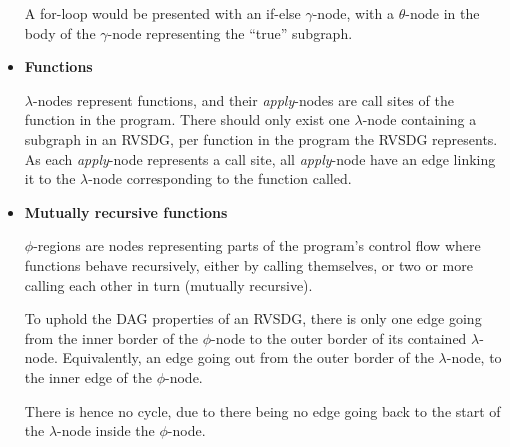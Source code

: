 \begin{itemize}
A for-loop would be presented with an if-else $\gamma$-node, with a
$\theta$-node in the body of the $\gamma$-node representing the ``true''
subgraph.

\item \textbf{Functions}

\textit{$\lambda$}-nodes represent functions, and their \textit{apply}-nodes are
call sites of the function in the program. There should only exist one
$\lambda$-node containing a subgraph in an RVSDG, per function in the program
the RVSDG represents. As each \textit{apply}-node represents a call site, all
\textit{apply}-node have an edge linking it to the $\lambda$-node corresponding
to the function called.

\item \textbf{Mutually recursive functions}

\textit{$\phi$}-regions are nodes representing parts of the program's control
flow where functions behave recursively, either by calling themselves, or two or
more calling each other in turn (mutually recursive).

To uphold the DAG properties of an RVSDG, there is only one edge going from the
inner border of the $\phi$-node to the outer border of its contained
$\lambda$-node. Equivalently, an edge going out from the outer border of the
$\lambda$-node, to the inner edge of the $\phi$-node.

There is hence no cycle, due to there being no edge going back to the start of
the $\lambda$-node inside the $\phi$-node.


\end{itemize}

